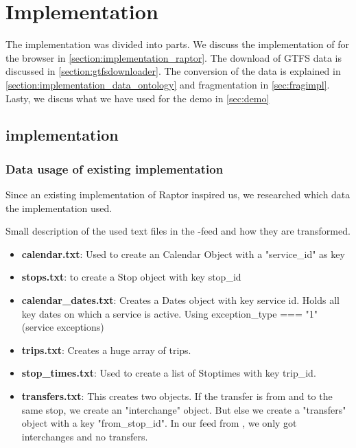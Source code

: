 \chapter{Implementation}
\label{chap:implementation}

The implementation was divided into  parts. We discuss the implementation of  for the browser in \autoref{section:implementation_raptor}. The download of GTFS data is discussed in \autoref{section:gtfsdownloader}. The conversion of the  data is explained in \autoref{section:implementation_data_ontology} and fragmentation in \autoref{sec:fragimpl}. Lasty, we discus what we have used for the demo in \autoref{sec:demo}


\section{ implementation}\label{section:implementation_raptor}
\subsection{Data usage of existing implementation}
Since an existing implementation of Raptor inspired us, we researched which data the implementation used.

Small description of the used text files in the -feed and how they are transformed.
\begin{itemize}
    \item \textbf{calendar.txt}: Used to create an Calendar Object with a "service\_id" as key
    \item \textbf{stops.txt}: to create a Stop object with key stop\_id
    \item \textbf{calendar\_dates.txt}: Creates a Dates object with key service id. Holds all key dates on which a service is active. Using exception\_type === "1" (service exceptions)
   \item \textbf{trips.txt}: Creates a huge array of trips.
   \item  \textbf{stop\_times.txt}: Used to create a list of Stoptimes with key trip\_id.
   
   \item \textbf{transfers.txt}: This creates two objects. If the transfer is from and to the same stop, we create an "interchange" object. But else we create a "transfers" object with a key "from\_stop\_id". In our feed from , we only got interchanges and no transfers.
\end{itemize}

